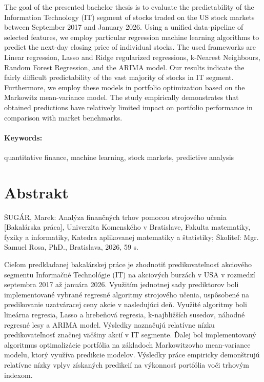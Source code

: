 \documentclass[12pt, oneside]{book}  %
\begin{document}
The goal of the presented bachelor thesis is to evaluate the predictability of the Information Technology (IT) segment of stocks traded on the US stock markets between September 2017 and January 2026. 
Using a unified data-pipeline of selected features, we employ particular regression machine learning algorithms to predict the next-day closing price of individual stocks.
The used frameworks are Linear regression, Lasso and Ridge regularized regressions, k-Nearest Neighbours, Random Forest Regression, and the ARIMA model. Our results indicate the fairly difficult predictability
of the vast majority of stocks in IT segment. Furthermore, we employ these models in portfolio optimization based on the Markowitz mean-variance model. The study empirically demonstrates that obtained predictions have relatively
limited impact on portfolio performance in comparison with market benchmarks.


\paragraph*{Keywords:}  quantitative finance, machine learning, stock markets, predictive analysis

\newpage 
\section*{Abstrakt}

ŠUGÁR, Marek: Analýza finančných trhov pomocou strojového učenia [Bakalárska práca], Univerzita Komenského v Bratislave, Fakulta matematiky, fyziky a informatiky,
Katedra aplikovanej matematiky a štatistiky; Školiteľ: Mgr. Samuel Rosa, PhD., Bratislava, 2026, 59 s.


Cieľom predkladanej bakalárskej práce je zhodnotiť predikovateľnosť akciového segmentu Informačné Technológie (IT) na akciových burzách v USA v rozmedzí septembra 2017 až januára 2026. Využitím jednotnej sady prediktorov boli
implementované vybrané regresné algoritmy strojového učenia, uspôsobené na predikovanie uzatváracej ceny akcie v nasledujúci deň. Využité algoritmy boli lineárna regresia, Lasso a hrebeňová regresia, k-najbližších susedov, náhodné regresné lesy a ARIMA model.
Výsledky naznačujú relatívne nízku predikovateľnosť značnej väčšiny akcií v IT segmente. Ďalej bol implementovaný algoritmus optimalizácie portfólia na základoch Markowitzovho mean-variance modelu, ktorý využíva predikcie modelov.
Výsledky práce empiricky demonštrujú relatívne nízky vplyv získaných predikcií na výkonnosť portfólia voči trhovým indexom.
\end{document}
